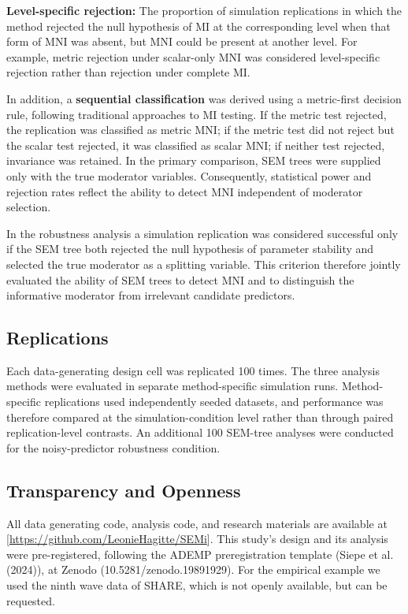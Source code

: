 \documentclass[
  man,
  floatsintext]{apa7}
\begin{document}
\textbf{Level-specific rejection:} The proportion of simulation
replications in which the method rejected the null hypothesis of MI at
the corresponding level when that form of MNI was absent, but MNI could
be present at another level. For example, metric rejection under
scalar-only MNI was considered level-specific rejection rather than
rejection under complete MI.

In addition, a \textbf{sequential classification} was derived using a
metric-first decision rule, following traditional approaches to MI
testing. If the metric test rejected, the replication was classified as
metric MNI; if the metric test did not reject but the scalar test
rejected, it was classified as scalar MNI; if neither test rejected,
invariance was retained. In the primary comparison, SEM trees were
supplied only with the true moderator variables. Consequently,
statistical power and rejection rates reflect the ability to detect MNI
independent of moderator selection.

In the robustness analysis a simulation replication was considered
successful only if the SEM tree both rejected the null hypothesis of
parameter stability and selected the true moderator as a splitting
variable. This criterion therefore jointly evaluated the ability of SEM
trees to detect MNI and to distinguish the informative moderator from
irrelevant candidate predictors.

\subsection{Replications}\label{replications}

Each data-generating design cell was replicated 100 times. The three
analysis methods were evaluated in separate method-specific simulation
runs. Method-specific replications used independently seeded datasets,
and performance was therefore compared at the simulation-condition level
rather than through paired replication-level contrasts. An additional
100 SEM-tree analyses were conducted for the noisy-predictor robustness
condition.

\subsection{Transparency and Openness}\label{transparency-and-openness}

All data generating code, analysis code, and research materials are
available at {[}\url{https://github.com/LeonieHagitte/SEMi}{]}. This
study's design and its analysis were pre-registered, following the ADEMP
preregistration template (Siepe et al. (2024)), at Zenodo
(10.5281/zenodo.19891929). For the empirical example we used the ninth
wave data of SHARE, which is not openly available, but can be requested.
\end{document}

